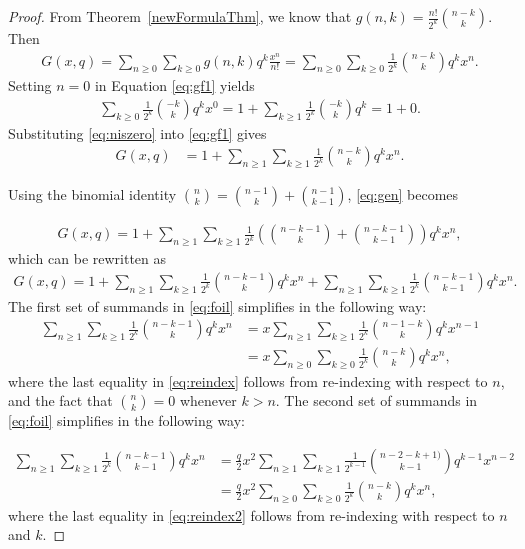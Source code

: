 \documentclass[11pt,reqno]{amsart}
\begin{document}
\begin{proof}
    From Theorem~\ref{newFormulaThm}, we know that $g(n,k)= \frac{n!}{2^k}\binom{n-k}{k}$. Then
    \begin{align}\label{eq:gf1}
        G(x,q) = \sum_{n\geq 0} \sum_{k\geq 0} g(n,k)q^k\frac{x^n}{n!} =  \sum_{n\geq 0} \sum_{k\geq 0} \frac{1}{2^k}\binom{n-k}{k}q^kx^n.
    \end{align}
    Setting $n=0$ in Equation \eqref{eq:gf1} yields
    \begin{align} \label{eq:niszero}
         \sum_{k\geq 0} \frac{1}{2^k}\binom{-k}{k}q^kx^0= 1+ \sum_{k\geq 1} \frac{1}{2^k}\binom{-k}{k}q^k = 1 + 0.
    \end{align}
Substituting \eqref{eq:niszero} into \eqref{eq:gf1} gives
\begin{align}\label{eq:gen}
   G(x,q) &=  1+\sum_{n\geq 1} \sum_{k\geq 1} \frac{1}{2^k}\binom{n-k}{k}q^kx^n.
    \end{align}

Using the binomial identity $\binom{n}{k}=\binom{n-1}{k}+\binom{n-1}{k-1}$, \eqref{eq:gen} becomes

\begin{align}\label{eq:binomId}
        G(x,q) =  1+\sum_{n\geq 1} \sum_{k\geq 1} \frac{1}{2^k}\left ( \binom{n-k -1}{k} + \binom{n-k-1}{k-1}\right )q^kx^n,
    \end{align}
    which can be rewritten as
    \begin{align}\label{eq:foil}
            G(x,q) =  1+\sum_{n\geq 1} \sum_{k\geq 1} \frac{1}{2^k} \binom{n-k -1}{k}q^kx^n + \sum_{n\geq 1} \sum_{k\geq 1} \frac{1}{2^k} \binom{n-k-1}{k-1} q^kx^n.
    \end{align}
    The first set of summands in \eqref{eq:foil} simplifies in the following way:
    \begin{align} 
    \label{eq:reindex}
        \sum_{n\geq 1} \sum_{k\geq 1} \frac{1}{2^k} \binom{n-k -1}{k}q^kx^n 
        &= x\sum_{n\geq 1} \sum_{k\geq 1} \frac{1}{2^k} \binom{n- 1 - k}{k}q^kx^{n-1} \nonumber \\
        &= x\sum_{n\geq 0} \sum_{k\geq 0} \frac{1}{2^k} \binom{n -k}{k}q^kx^{n},
    \end{align}
    where the last equality in \eqref{eq:reindex} follows from re-indexing with respect to $n$, and the fact that $\binom{n}{k}=0$ whenever $k>n$.
The second set of summands in \eqref{eq:foil} simplifies in the following way:

    \begin{align} 
        \sum_{n\geq 1} \sum_{k\geq 1} \frac{1}{2^k} \binom{n-k-1}{k-1} q^kx^n 
        &= \frac{q}{2}x^{2} \sum_{n\geq 1} \sum_{k\geq 1} \frac{1}{2^{k-1}} \binom{n-2- k + 1)}{k-1} q^{k-1}x^{n-2} \nonumber\\
        &= \frac{q}{2}x^{2} \sum_{n\geq 0} \sum_{k\geq 0} \frac{1}{2^{k}} \binom{n-k}{k} q^{k}x^{n},\label{eq:reindex2}
    \end{align}
    where the last equality in \eqref{eq:reindex2} follows from re-indexing with respect to $n$ and $k$.


\end{proof}
\end{document}
